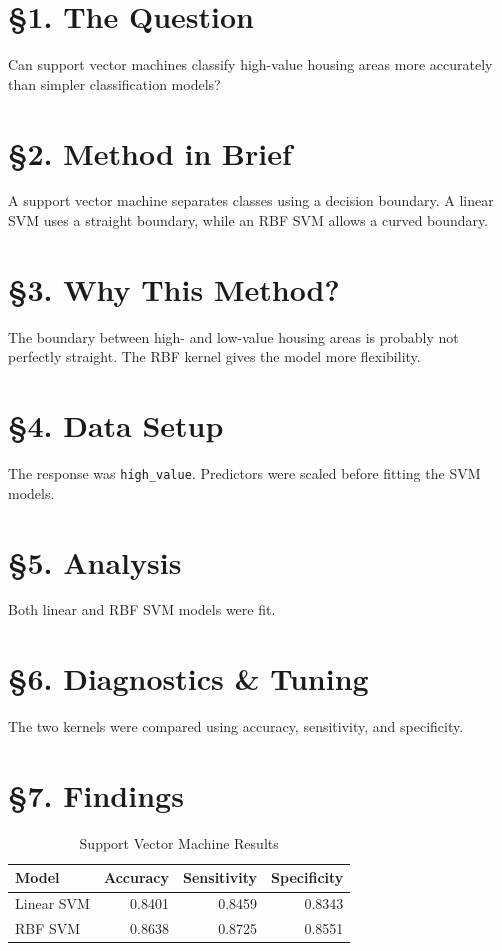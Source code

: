 \documentclass[12pt]{report}
\begin{document}
\section*{\S1. The Question}
Can support vector machines classify high-value housing areas more accurately than simpler classification models?

\section*{\S2. Method in Brief}
A support vector machine separates classes using a decision boundary. A linear SVM uses a straight boundary, while an RBF SVM allows a curved boundary.

\section*{\S3. Why This Method?}
The boundary between high- and low-value housing areas is probably not perfectly straight. The RBF kernel gives the model more flexibility.

\section*{\S4. Data Setup}
The response was \texttt{high\_value}. Predictors were scaled before fitting the SVM models.

\section*{\S5. Analysis}
Both linear and RBF SVM models were fit.

\section*{\S6. Diagnostics \& Tuning}
The two kernels were compared using accuracy, sensitivity, and specificity.

\section*{\S7. Findings}

\begin{table}[H]
\centering
\caption{Support Vector Machine Results}
\begin{tabular}{lrrr}
\toprule
Model & Accuracy & Sensitivity & Specificity \\
\midrule
Linear SVM & 0.8401 & 0.8459 & 0.8343 \\
RBF SVM & 0.8638 & 0.8725 & 0.8551 \\
\bottomrule
\end{tabular}
\end{table}
\end{document}
